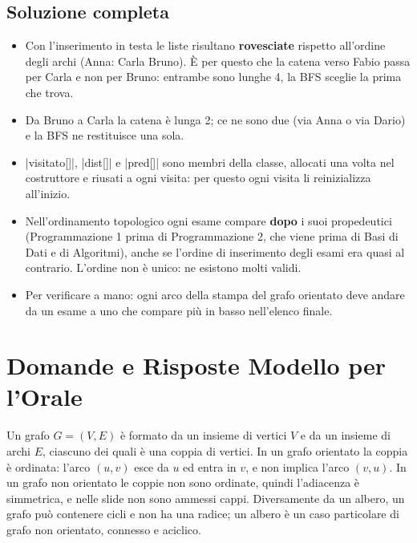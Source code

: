 \subsection*{Soluzione completa}

\begin{consiglio}
\begin{itemize}
  \item Con l'inserimento in testa le liste risultano \textbf{rovesciate} rispetto
        all'ordine degli archi (Anna: Carla Bruno). È per questo che la catena verso
        Fabio passa per Carla e non per Bruno: entrambe sono lunghe 4, la BFS sceglie la
        prima che trova.
  \item Da Bruno a Carla la catena è lunga 2; ce ne sono due (via Anna o via Dario) e la
        BFS ne restituisce una sola.
  \item \cc|visitato[]|, \cc|dist[]| e \cc|pred[]| sono membri della classe, allocati una
        volta nel costruttore e riusati a ogni visita: per questo ogni visita li
        reinizializza all'inizio.
  \item Nell'ordinamento topologico ogni esame compare \textbf{dopo} i suoi propedeutici
        (Programmazione 1 prima di Programmazione 2, che viene prima di Basi di Dati e di
        Algoritmi), anche se l'ordine di inserimento degli esami era quasi al contrario.
        L'ordine non è unico: ne esistono molti validi.
  \item Per verificare a mano: ogni arco della stampa del grafo orientato deve andare da
        un esame a uno che compare più in basso nell'elenco finale.
\end{itemize}
\end{consiglio}

\section{Domande e Risposte Modello per l'Orale}

\begin{orale}
Un grafo $G = (V, E)$ è formato da un insieme di vertici $V$ e da un insieme di archi $E$,
ciascuno dei quali è una coppia di vertici. In un grafo orientato la coppia è ordinata:
l'arco $(u, v)$ esce da $u$ ed entra in $v$, e non implica l'arco $(v, u)$. In un grafo non
orientato le coppie non sono ordinate, quindi l'adiacenza è simmetrica, e nelle slide non
sono ammessi cappi. Diversamente da un albero, un grafo può contenere cicli e non ha una
radice; un albero è un caso particolare di grafo non orientato, connesso e aciclico.
\end{orale}

